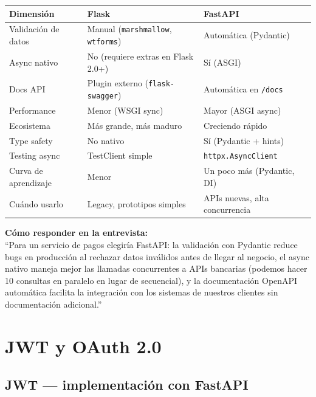 \documentclass[11pt,a4paper]{article}
\begin{document}
\begin{center}
\begin{tabular}{p{3.5cm} p{4.5cm} p{4.5cm}}
\toprule
\textbf{Dimensión} & \textbf{Flask} & \textbf{FastAPI} \\
\midrule
Validación de datos
  & Manual (\texttt{marshmallow}, \texttt{wtforms})
  & Automática (Pydantic) \\
Async nativo
  & No (requiere extras en Flask 2.0+)
  & Sí (ASGI) \\
Docs API
  & Plugin externo (\texttt{flask-swagger})
  & Automática en \texttt{/docs} \\
Performance
  & Menor (WSGI sync)
  & Mayor (ASGI async) \\
Ecosistema
  & Más grande, más maduro
  & Creciendo rápido \\
Type safety
  & No nativo
  & Sí (Pydantic + hints) \\
Testing async
  & TestClient simple
  & \texttt{httpx.AsyncClient} \\
Curva de aprendizaje
  & Menor
  & Un poco más (Pydantic, DI) \\
Cuándo usarlo
  & Legacy, prototipos simples
  & APIs nuevas, alta concurrencia \\
\bottomrule
\end{tabular}
\end{center}

\vspace{0.5em}

\begin{keybox}
\textbf{Cómo responder en la entrevista:}\\[4pt]
``Para un servicio de pagos elegiría FastAPI: la validación con Pydantic
reduce bugs en producción al rechazar datos inválidos antes de llegar
al negocio, el async nativo maneja mejor las llamadas concurrentes a
APIs bancarias (podemos hacer 10 consultas en paralelo en lugar de
secuencial), y la documentación OpenAPI automática facilita la
integración con los sistemas de nuestros clientes sin documentación
adicional.''
\end{keybox}

\section{JWT y OAuth 2.0}

\subsection{JWT — implementación con FastAPI}
\end{document}
